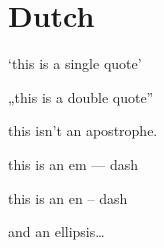 
\def\mytitle{MultiMarkdown Dutch Test}

\part{Dutch}
\label{dutch}

`this is a single quote'

„this is a double quote''

this isn't an apostrophe.

this is an em --- dash

this is an en -- dash

and an ellipsis{\ldots}





